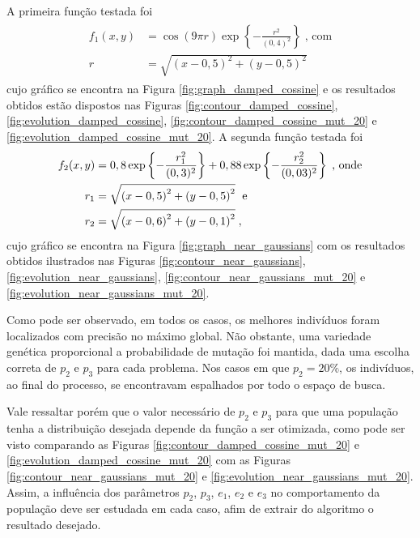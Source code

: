 A primeira função testada foi
\begin{align}
  \begin{split}    
    f_1(x,y) & = \cos(9\pi r)\exp\left\{-\frac{r^2}{(0,4)^2}\right\} \;\text{, com} \\
    r      & = \sqrt{
      \left(x - 0,5\right)^2 +
      \left(y - 0,5\right)^2
    }
  \end{split}
  \label{eq:func_damped_cossine}
\end{align}
cujo gráfico se encontra na Figura \ref{fig:graph_damped_cossine} e os
resultados obtidos estão dispostos nas Figuras \ref{fig:contour_damped_cossine},
\ref{fig:evolution_damped_cossine}, \ref{fig:contour_damped_cossine_mut_20} e 
\ref{fig:evolution_damped_cossine_mut_20}. A segunda função testada foi
\begin{align}
  \begin{split}
    f_2(x,y) & = 0,8 \exp\left\{-\frac{r_1^2}{(0,3)^2}\right\} +
    0,88 \exp\left\{-\frac{r_2^2}{(0,03)^2}\right\} \;\text{, onde} \\
    r_1      & = \sqrt{
      \left(x - 0,5\right)^2 +
      \left(y - 0,5\right)^2
    } \;\text{ e} \\
    r_2      & = \sqrt{
      \left(x - 0,6\right)^2 +
      \left(y - 0,1\right)^2
    } \;\mathrm{,}
  \end{split}
  \label{eq:func_near_gaussians}
\end{align}
cujo gráfico se encontra na Figura \ref{fig:graph_near_gaussians} com os
resultados obtidos ilustrados nas Figuras \ref{fig:contour_near_gaussians},
\ref{fig:evolution_near_gaussians}, \ref{fig:contour_near_gaussians_mut_20} e 
\ref{fig:evolution_near_gaussians_mut_20}.

Como pode ser observado, em todos os casos, os melhores indivíduos foram localizados 
com precisão no máximo global. Não obstante, uma variedade genética proporcional a
probabilidade de mutação foi mantida, dada uma escolha correta de $p_2$ e $p_3$ para cada
problema. Nos casos em que $p_2 = 20\%$, os indivíduos, ao final do processo, se encontravam
espalhados por todo o espaço de busca. 

Vale ressaltar porém que o valor necessário de $p_2$ e $p_3$ para que uma população 
tenha a distribuição desejada depende da função a ser otimizada, como pode ser visto
comparando as Figuras \ref{fig:contour_damped_cossine_mut_20} e \ref{fig:evolution_damped_cossine_mut_20}
com as Figuras \ref{fig:contour_near_gaussians_mut_20} e \ref{fig:evolution_near_gaussians_mut_20}.
Assim, a influência dos parâmetros $p_2$, $p_3$, $e_1$, $e_2$ e $e_3$ no comportamento da população
deve ser estudada em cada caso, afim de extrair do algoritmo o resultado desejado.

